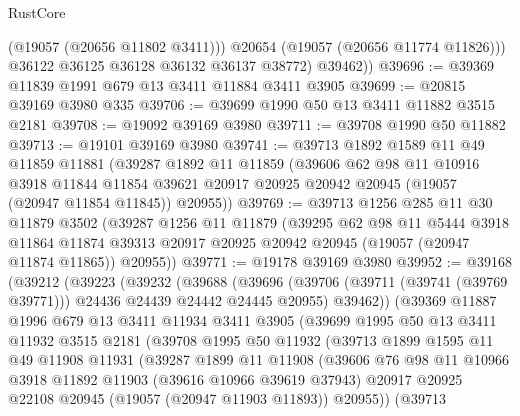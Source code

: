 \begin{lexlean}{RustCore}
\begin{coremodule}
              (@19057 (@20656 @11802 @3411)))
            @20654
            (@19057 (@20656 @11774 @11826)))
          @36122
          @36125
          @36128
          @36132
          @36137
          @38772)
        @39462))
@39696 := @39369 @11839 @1991 @679 @13 @3411 @11884 @3411 @3905
@39699 := @20815 @39169 @3980 @335
@39706 := @39699 @1990 @50 @13 @3411 @11882 @3515 @2181
@39708 := @19092 @39169 @3980
@39711 := @39708 @1990 @50 @11882
@39713 := @19101 @39169 @3980
@39741 := @39713
    @1892
    @1589
    @11
    @49
    @11859
    @11881
    (@39287
      @1892
      @11
      @11859
      (@39606
        @62
        @98
        @11
        @10916
        @3918
        @11844
        @11854
        @39621
        @20917
        @20925
        @20942
        @20945
        (@19057 (@20947 @11854 @11845))
        @20955))
@39769 := @39713
    @1256
    @285
    @11
    @30
    @11879
    @3502
    (@39287
      @1256
      @11
      @11879
      (@39295
        @62
        @98
        @11
        @5444
        @3918
        @11864
        @11874
        @39313
        @20917
        @20925
        @20942
        @20945
        (@19057 (@20947 @11874 @11865))
        @20955))
@39771 := @19178 @39169 @3980
@39952 := @39168
    (@39212
      (@39223
        (@39232
          (@39688
            (@39696
              (@39706 (@39711 (@39741 (@39769 @39771))) @24436 @24439 @24442 @24445 @20955)
              @39462))
          (@39369
            @11887
            @1996
            @679
            @13
            @3411
            @11934
            @3411
            @3905
            (@39699
              @1995
              @50
              @13
              @3411
              @11932
              @3515
              @2181
              (@39708
                @1995
                @50
                @11932
                (@39713
                  @1899
                  @1595
                  @11
                  @49
                  @11908
                  @11931
                  (@39287
                    @1899
                    @11
                    @11908
                    (@39606
                      @76
                      @98
                      @11
                      @10966
                      @3918
                      @11892
                      @11903
                      (@39616 @10966 @39619 @37943)
                      @20917
                      @20925
                      @22108
                      @20945
                      (@19057 (@20947 @11903 @11893))
                      @20955))
                  (@39713

\end{coremodule}
\end{lexlean}

